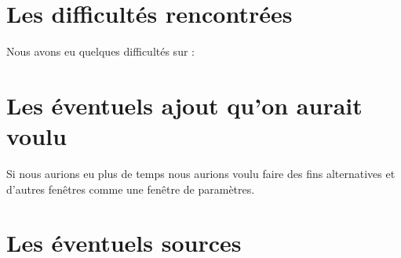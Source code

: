 \documentclass[a4paper, 11pt]{article}
\begin{document}
\section{Les difficultés rencontrées}

Nous avons eu quelques difficultés sur : \\

\newpage

\section{Les éventuels ajout qu'on aurait voulu}

Si nous aurions eu plus de temps nous aurions voulu faire des fins alternatives et d'autres fenêtres comme une fenêtre de paramètres.\\

\newpage

\section{Les éventuels sources}
\end{document}
